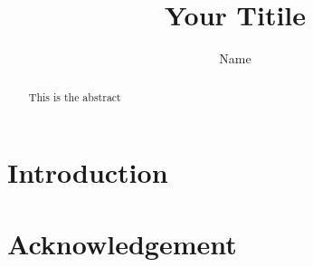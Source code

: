 \documentclass[coverpage]{sty/inftechrep}
\begin{document}
\title{\Huge{Your Titile}}
\author{Name}


\maketitle

\begin{abstract}
This is the abstract
\end{abstract}

\section{Introduction}


\section*{Acknowledgement}

\printbibliography
\end{document}
